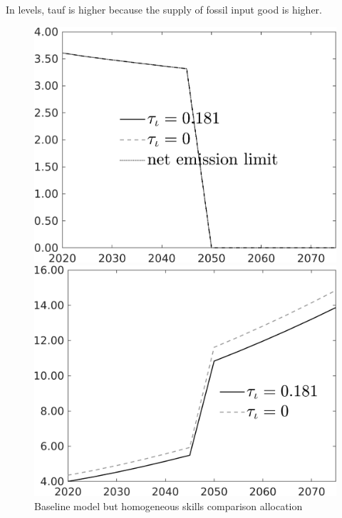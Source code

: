 \documentclass[12pt]{article}
\begin{document}
In levels, tauf is higher because the supply of fossil input good is higher. 
\begin{figure}[h!!]
	\centering
	\caption{Baseline model but homogeneous skills comparison allocation}\label{fig:Leveltauf_nsk1_xgr0_notaul}
	\begin{minipage}[]{0.32\textwidth}
		\includegraphics[width=1\textwidth]{../../codding_model/own_basedOnFried/optimalPol_010922_revision/figures/all_13Sept22/CompTauf_bytaul_Reg0_Emnet_spillover0_nsk1_xgr0_knspil0_sep1_LFlimit1_emsbase0_countec0_GovRev0_etaa0.79_lgd1.png}
	\end{minipage}		
	\begin{minipage}[]{0.32\textwidth}
		\includegraphics[width=1\textwidth]{../../codding_model/own_basedOnFried/optimalPol_010922_revision/figures/all_13Sept22/CompTauf_bytaul_Reg0_tauf_spillover0_nsk1_xgr0_knspil0_sep1_LFlimit1_emsbase0_countec0_GovRev0_etaa0.79_lgd1.png}

\end{minipage}
\end{figure}
\end{document}
